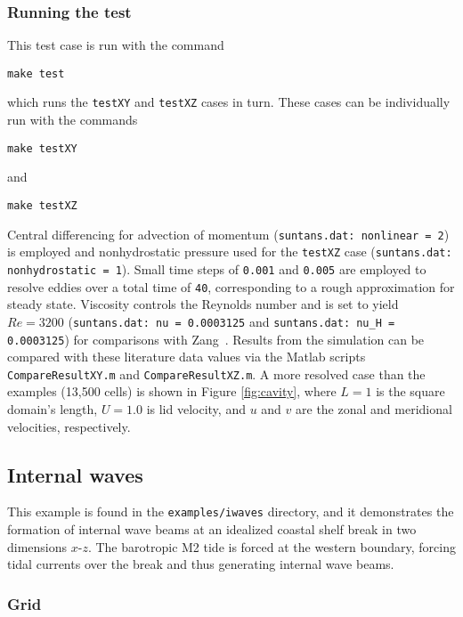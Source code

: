 \subsubsection{Running the test}
This test case is run with the command
\begin{verbatim}
make test
\end{verbatim}
which runs the \verb+testXY+ and \verb+testXZ+ cases in turn.  These cases can 
be individually run with the commands
\begin{verbatim}
make testXY
\end{verbatim}
and
\begin{verbatim}
make testXZ
\end{verbatim}
Central differencing for advection of momentum 
(\verb+suntans.dat: nonlinear = 2+) is employed and nonhydrostatic pressure
used for the \verb+testXZ+ case (\verb+suntans.dat: nonhydrostatic = 1+).  Small
time steps of \verb+0.001+ and \verb+0.005+ are employed to resolve 
eddies over a total time of \verb+40+, corresponding to a rough approximation
for steady state.  Viscosity controls the Reynolds number and is set to 
yield $Re=3200$ (\verb+suntans.dat: nu = 0.0003125+ and 
\verb+suntans.dat: nu_H = 0.0003125+) for comparisons with 
Zang\etal~\cite{Zang[1994]}.  Results from the simulation can be compared with
these literature data values via the Matlab scripts \verb+CompareResultXY.m+ and 
\verb+CompareResultXZ.m+.  A more resolved case than the examples (13,500 cells)
is shown in  Figure \ref{fig:cavity}, where $L=1$ is the square domain's length,
$U=1.0$ is lid velocity, and $u$ and $v$ are the zonal and meridional velocities,
respectively.  

\subsection{Internal waves} \label{sec:internalwaves}

This example is found in the \verb+examples/iwaves+ directory, and it demonstrates the formation
of internal wave beams at an idealized coastal shelf break in two dimensions $x$-$z$.  The barotropic
M2 tide is forced at the western boundary, forcing tidal currents over the break and thus generating
internal wave beams.

\subsubsection{Grid}

